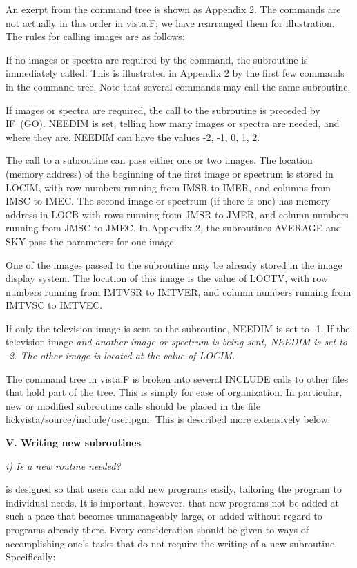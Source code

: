 	An exerpt from the command tree is shown as Appendix 2. The
commands are not actually in this order in vista.F;  we have
rearranged them for illustration.  The rules for calling images are as
follows:

\hang
{}If no images or spectra are required by
the command, the subroutine is immediately called. This is illustrated
in Appendix 2 by the first few commands in the command tree.  Note
that several commands may call the same subroutine. 

\hang
{}If images or spectra are
required, the call to the subroutine is preceded by {IF\ (GO)}. 
NEEDIM is set, telling how many images or spectra are needed,
and where they are.  NEEDIM can have the values -2, -1, 0, 1, 2.

\hang
{}The call to a subroutine can pass
either one or two images.  The location (memory address) of the
beginning of the first image or spectrum is stored in LOCIM, with row
numbers running from IMSR to IMER, and columns from IMSC to IMEC.
The second image or spectrum (if there is one) has memory address in
LOCB with rows running from JMSR to JMER, and column numbers running
from JMSC to JMEC.  In Appendix 2, the subroutines AVERAGE and SKY
pass the parameters for one image.

\hang
{}One of the images passed to the
subroutine may be already stored in the image display system. The
location of this image is the value of LOCTV, with row numbers running
from IMTVSR to IMTVER, and column numbers running from IMTVSC to
IMTVEC. 

\hang
{}If only the television image is sent to
the subroutine, NEEDIM is set to -1.  If the television image \it and
\rm another image or spectrum is being sent, NEEDIM is set to -2. The
other image is located at the value of LOCIM.  

	The command tree in vista.F is broken into several INCLUDE
calls to other files that hold part of the tree. This is simply for
ease of organization. In particular, new or modified subroutine calls
should be placed in the file lickvista/source/include/user.pgm. This
is described more extensively below.

\vskip 0.5in
\Sskip
\centerline {\bf V. Writing new subroutines\rm}

\vskip 0.125in
\centerline {\it i) Is a new routine needed?\rm}

\vskip 0.125in
	\V is designed so that users can add new programs easily,
tailoring the program to individual needs.  It is important, however,
that new programs not be added at such a pace that \V becomes
unmanageably large, or added without regard to programs already there.
Every consideration should be given to ways of accomplishing one's
tasks that do not require the writing of a new subroutine. 
Specifically: 
	
